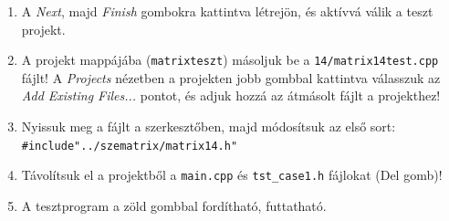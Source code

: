 \begin{frame}
  \begin{enumerate}
    \setcounter{enumi}{\theqt}
    \item A \emph{Next}, majd \emph{Finish} gombokra kattintva létrejön, és aktívvá válik a teszt projekt.
    \item A projekt mappájába (\texttt{matrixteszt}) másoljuk be a \texttt{14/matrix14test.cpp} fájlt! A \emph{Projects} nézetben a projekten jobb gombbal kattintva válasszuk az \emph{Add Existing Files...} pontot, és adjuk hozzá az átmásolt fájlt a projekthez!
    \item Nyissuk meg a fájlt a szerkesztőben, majd módosítsuk az első sort: \texttt{\#include"../szematrix/matrix14.h"}
    \item Távolítsuk el a projektből a \texttt{main.cpp} és \texttt{tst\_case1.h} fájlokat (Del gomb)!
    \item A tesztprogram a zöld gombbal fordítható, futtatható.
    \setcounter{qt}{\theenumi}
  \end{enumerate}
\end{frame}

